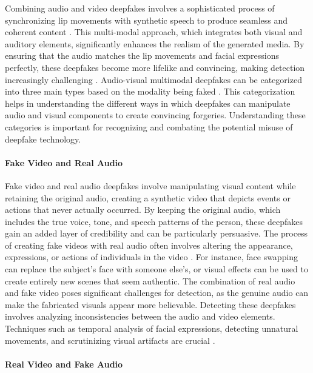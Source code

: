 Combining audio and video deepfakes involves a sophisticated process of synchronizing lip movements with synthetic speech to produce seamless and coherent content \cite{liz2024generation}. This multi-modal approach, which integrates both visual and auditory elements, significantly enhances the realism of the generated media. By ensuring that the audio matches the lip movements and facial expressions perfectly, these deepfakes become more lifelike and convincing, making detection increasingly challenging \cite{hou2024polyglotfake}. Audio-visual multimodal deepfakes can be categorized into three main types based on the modality being faked \cite{khalid2021fakeavceleb}. This categorization helps in understanding the different ways in which deepfakes can manipulate audio and visual components to create convincing forgeries. Understanding these categories is important for recognizing and combating the potential misuse of deepfake technology.

\paragraph{Fake Video and Real Audio}
\label{para:multimodal_fakeV_realA}

Fake video and real audio deepfakes involve manipulating visual content while retaining the original audio, creating a synthetic video that depicts events or actions that never actually occurred. By keeping the original audio, which includes the true voice, tone, and speech patterns of the person, these deepfakes gain an added layer of credibility and can be particularly persuasive. The process of creating fake videos with real audio often involves altering the appearance, expressions, or actions of individuals in the video \cite{karras2019style, nirkin2019fsgan, korshunova2017fast}. For instance, face swapping \cite{korshunova2017fast} can replace the subject’s face with someone else's, or visual effects can be used to create entirely new scenes that seem authentic. The combination of real audio and fake video poses significant challenges for detection, as the genuine audio can make the fabricated visuals appear more believable. Detecting these deepfakes involves analyzing inconsistencies between the audio and video elements. Techniques such as temporal analysis of facial expressions, detecting unnatural movements, and scrutinizing visual artifacts are crucial \cite{kaur2020deepfakes, liu2023ti2net}.

\paragraph{Real Video and Fake Audio}
\label{para:multimodal_realV_fakeA}

